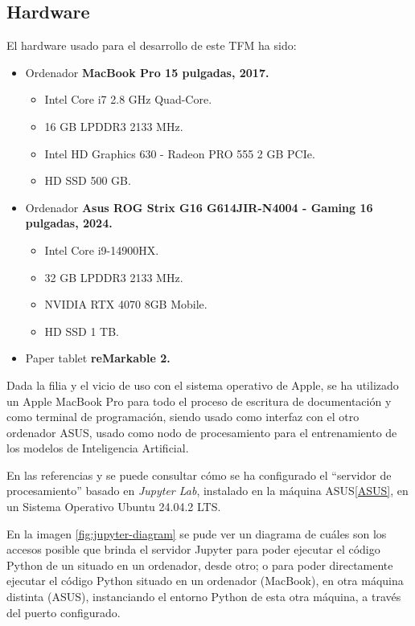 \subsection{Hardware}

El hardware usado para el desarrollo de este TFM ha sido:

\begin{itemize}
    \item Ordenador \textbf{MacBook Pro 15 pulgadas, 2017.}
    \begin{itemize}
        \item Intel Core i7 2.8 GHz Quad-Core.
        \item 16 GB LPDDR3 2133 MHz.
        \item Intel HD Graphics 630 - Radeon PRO 555 2 GB PCIe.
        \item HD SSD 500 GB.
    \end{itemize}
    \item Ordenador \textbf{Asus ROG Strix G16 G614JIR-N4004 - Gaming 16 pulgadas, 2024.}
    \label{ASUS}
    \begin{itemize}
        \item Intel Core i9-14900HX.
        \item 32 GB LPDDR3 2133 MHz.
        \item NVIDIA RTX 4070 8GB Mobile.
        \item HD SSD 1 TB.
    \end{itemize}
    \item Paper tablet \textbf{reMarkable 2.}
\end{itemize}

Dada la filia y el vicio de uso con el sistema operativo de Apple, se ha utilizado un Apple MacBook Pro para todo el proceso de escritura de documentación y como terminal de programación, siendo usado como interfaz con el otro ordenador ASUS, usado como nodo de procesamiento para el entrenamiento de los modelos de Inteligencia Artificial.

En las referencias \cite{geeksforgeeks2025jupyter} y \cite{vscode2025jupyter} se puede consultar cómo se ha configurado el ``servidor de procesamiento'' basado en \emph{Jupyter Lab}, instalado en la máquina ASUS\ref{ASUS}, en un Sistema Operativo Ubuntu 24.04.2 LTS.

En la imagen \ref{fig:jupyter-diagram} se pude ver un diagrama de cuáles son los accesos posible que brinda el servidor Jupyter para poder ejecutar el código Python de un situado en un ordenador, desde otro; o para poder directamente ejecutar el código Python situado en un ordenador (MacBook), en otra máquina distinta (ASUS), instanciando el entorno Python de esta otra máquina, a través del puerto configurado.


